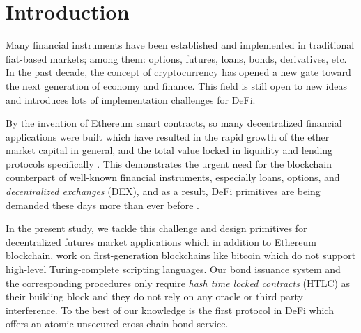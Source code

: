 \section{Introduction}
\label{sec:w-motiv}

Many financial instruments have been established and implemented in traditional fiat-based markets; 
among them: options, futures, loans, bonds, derivatives, etc. In the past decade, the concept of cryptocurrency has opened a new gate toward the next generation of economy and finance. This field is still open to new ideas and introduces lots of implementation challenges for DeFi. 

By the invention of Ethereum smart contracts, so many decentralized financial applications were built which have resulted in the rapid growth of the ether market capital in general, and the total value locked in liquidity and lending protocols specifically \cite{aave, maker, compound, wbtc, dydx}. This demonstrates the urgent need for the blockchain counterpart of well-known financial instruments, especially loans, options, and \emph{decentralized exchanges} (DEX), and as a result, DeFi primitives are being demanded these days more than ever before \cite{buterin2014next, uniswap, flashswaps, jelly}. 

In the present study, we tackle this challenge and design primitives for decentralized futures market applications which in addition to Ethereum blockchain, work on first-generation blockchains like bitcoin which do not support high-level Turing-complete scripting languages. Our bond issuance system and the corresponding procedures only require \emph{hash time locked contracts} (HTLC) as their building block and they do not rely on any oracle or third party interference. To the best of our knowledge \abcd is the first protocol in DeFi which offers an atomic unsecured cross-chain bond service.

